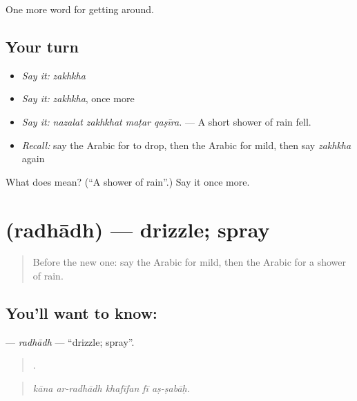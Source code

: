 \begin{grammarlens}[title={What you've built}]
One more word for getting around.
\end{grammarlens}

\subsection*{Your turn}
\begin{itemize}
\raggedright
  \item \emph{Say it:} \emph{zakhkha}
  \item \emph{Say it:} \emph{zakhkha}, once more
  \item \emph{Say it:} \emph{nazalat zakhkhat maṭar qaṣīra.} — A short shower of rain fell.
  \item \emph{Recall:} say the Arabic for to drop, then the Arabic for mild, then say \emph{zakhkha} again
\end{itemize}

\begin{tcolorbox}[breakable,colback=teal!4,colframe=teal!35!black,title={Before you move on}]
What does  mean? (\textquotedblleft{}A shower of rain\textquotedblright{}.) Say it once more.
\end{tcolorbox}
\section[\texorpdfstring{\ar{رذاذ} (radhādh)}{رذاذ (radhādh)}]{ (radhādh) — drizzle; spray}

\label{lesson:AR-C481-radhadh}



\begin{quote}
Before the new one: say the Arabic for mild, then the Arabic for a shower of rain.
\end{quote}

\subsection*{You'll want to know: }
\textbf{} — \emph{radhādh} — \textquotedblleft{}drizzle; spray\textquotedblright{}.

\begin{quote}
    .
\end{quote}

\begin{quote}
\emph{kāna ar-radhādh khafīfan fī aṣ-ṣabāḥ.}
\end{quote}

